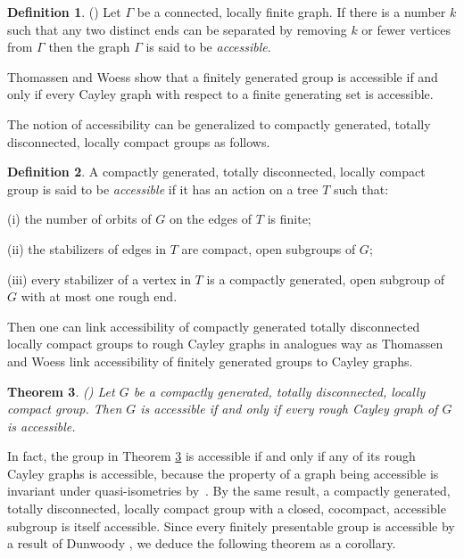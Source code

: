\documentclass{emsprocart}
\newtheorem{theorem}{Theorem}[section]
\theoremstyle{definition}
\newtheorem{definition}[theorem]{Definition}
\begin{document}
\begin{definition}{\rm (\cite[p.~249]{ThomassenWoess1993})}
\label{DGraphAccessibility}
Let $\Gamma$ be a connected, locally finite graph.  If there is a
number $k$ such that any two distinct ends can be separated by
removing $k$ or fewer vertices from $\Gamma$ then the graph $\Gamma$
is said to be {\em accessible}.
\end{definition}

Thomassen and Woess
\cite[Theorem~1.1]{ThomassenWoess1993} show that a finitely generated
  group is accessible if and only if every Cayley graph with respect
  to a finite generating set is accessible.

The notion of accessibility can be generalized to compactly generated,
totally disconnected, locally compact groups as follows.

\begin{definition}\label{DTopoAccessibility}
A compactly generated, totally disconnected, locally compact
group is said to be {\em accessible} if it has an
action on a tree $T$ such that:

(i) the number of orbits of $G$ on the edges of $T$ is finite;

(ii) the stabilizers of edges in $T$ are compact, open subgroups of
$G$;

(iii) every stabilizer of a vertex in $T$ is a compactly
generated, open subgroup of $G$ with at most one rough end.

\end{definition}

Then one can link accessibility 
of compactly generated totally disconnected locally
compact groups to rough Cayley graphs in analogues
way as Thomassen and Woess link accessibility of finitely generated
groups to Cayley graphs.

 \begin{theorem}{\rm (\cite[Theorem~3.27]{KronMoller2008})}
\label{TAccessible}
Let $G$ be a compactly generated, totally disconnected, locally compact
group.  Then $G$ is accessible if and only if every rough Cayley graph
of $G$ is accessible.
\end{theorem}

In fact, the group in Theorem \ref{TAccessible} is accessible if and only if
any of its rough Cayley graphs is accessible, because the
property of a graph being accessible is invariant under
quasi-isometries by~\cite[Theorem~0.4]{PapasogluWhyte2002}.  By the same result,
a compactly generated, totally disconnected, locally compact group
with a closed, cocompact, accessible subgroup is itself accessible.
Since every finitely presentable group is accessible by a result
of Dunwoody \cite{Dunwoody1985}, we deduce the following theorem as a corollary.
\end{document}

